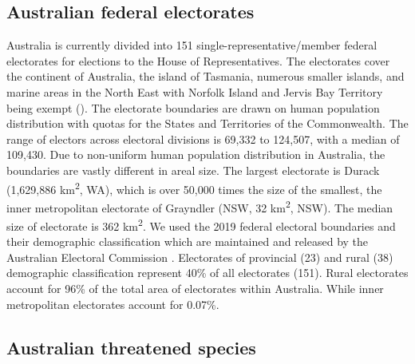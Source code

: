 \documentclass[a4paper,11pt]{article}
\begin{document}
\subsection{Australian federal electorates}

Australia is currently divided into 151 single-representative/member federal electorates for elections to the House of Representatives. The electorates cover the continent of Australia, the island of Tasmania, numerous smaller islands, and marine areas in the North East with Norfolk Island and Jervis Bay Territory being exempt (\cite{parliamentofaustraliaElectoralDivisions2018}). The electorate boundaries are drawn on human population distribution with quotas for the States and Territories of the Commonwealth. The range of electors across electoral divisions is 69,332 to 124,507, with a median of 109,430. Due to non-uniform human population distribution in Australia, the boundaries are vastly different in areal size. The largest electorate is Durack (1,629,886 km\textsuperscript{2}, WA), which is over 50,000 times the size of the smallest, the inner metropolitan electorate of Grayndler (NSW, 32 km\textsuperscript{2}, NSW). The median size of electorate is 362 km\textsuperscript{2}. We used the 2019 federal electoral boundaries and their demographic classification which are maintained and released by the Australian Electoral Commission \cite{australiaelectoralcomissionFederalElectoralBoundaries2019}. Electorates of provincial (23) and rural (38) demographic classification represent 40\% of all electorates (151). Rural electorates account for 96\% of the total area of electorates within Australia. While inner metropolitan electorates account for 0.07\%.

\subsection{Australian threatened species}
\end{document}
